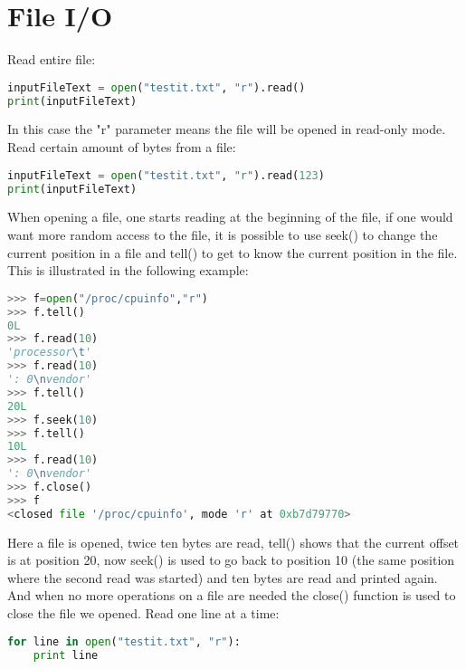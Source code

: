 \section{File I/O}
Read entire file:
\lstset{basicstyle=\scriptsize, numbers=left, captionpos=b, tabsize=4}
\begin{lstlisting}[caption=Reading a File,language={Python},
xleftmargin=15pt, label=lst:readingafile]
inputFileText = open("testit.txt", "r").read()
print(inputFileText)
\end{lstlisting}

In this case the "r" parameter means the file will be opened in read-only mode.
Read certain amount of bytes from a file:
\lstset{basicstyle=\scriptsize, numbers=left, captionpos=b, tabsize=4}
\begin{lstlisting}[caption=Reading number of bytes,language={Python},
xleftmargin=15pt, label=lst:readingnumberofbytes]
inputFileText = open("testit.txt", "r").read(123)
print(inputFileText)
\end{lstlisting}
When opening a file, one starts reading at the beginning of the file, if one
would want more random access to the file, it is possible to use seek() to
change the current position in a file and tell() to get to know the current
position in the file. This is illustrated in the following example:
\lstset{basicstyle=\scriptsize, numbers=left, captionpos=b, tabsize=4}
\begin{lstlisting}[caption=Tell and seek on File,language={Python},
xleftmargin=15pt, label=lst:tellandseekonfile]
>>> f=open("/proc/cpuinfo","r")
>>> f.tell()
0L
>>> f.read(10)
'processor\t'
>>> f.read(10)
': 0\nvendor'
>>> f.tell()
20L
>>> f.seek(10)
>>> f.tell()
10L
>>> f.read(10)
': 0\nvendor'
>>> f.close()
>>> f
<closed file '/proc/cpuinfo', mode 'r' at 0xb7d79770>
\end{lstlisting}

Here a file is opened, twice ten bytes are read, tell() shows that the current
offset is at position 20, now seek() is used to go back to position 10 (the same
position where the second read was started) and ten bytes are read and printed
again. And when no more operations on a file are needed the close() function is
used to close the file we opened.  Read one line at a time:
\lstset{basicstyle=\scriptsize, numbers=left, captionpos=b, tabsize=4}
\begin{lstlisting}[caption=Line by Line,language={Python},
xleftmargin=15pt, label=lst:linebyline]
for line in open("testit.txt", "r"):
    print line
\end{lstlisting}


